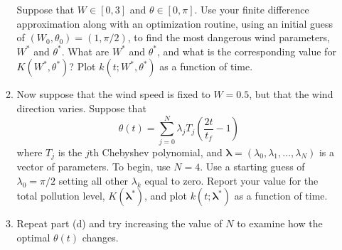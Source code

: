 \documentclass[11pt]{article}
\begin{document}
\begin{enumerate}
\begin{enumerate}
	Suppose that $W \in [0,3]$ and $\theta \in [0,\pi]$. Use your finite
	difference approximation along with an optimization routine, using an
	initial guess of $(W_0,\theta_0) = (1,\pi/2)$, to find the most
	dangerous wind parameters, $W^\ast$ and $\theta^\ast$. What are
	$W^\ast$ and $\theta^\ast$, and what is the corresponding value for
	$K(W^\ast,\theta^\ast)$? Plot $k(t;W^\ast,\theta^\ast)$ as a function
	of time.
      \item Now suppose that the wind speed is fixed to $W=0.5$, but that
	the wind direction varies. Suppose that
	\begin{equation}
	  \theta(t) = \sum_{j=0}^N \lambda_j T_j\left( \frac{2t}{t_f}-1\right)
        \end{equation}
	where $T_j$ is the $j$th Chebyshev polynomial, and
	$\boldsymbol\lambda=(\lambda_0,\lambda_1,\ldots,\lambda_N)$ is a vector
	of parameters. To begin, use $N=4$. Use a starting guess of
	$\lambda_0=\pi/2$ setting all other $\lambda_k$ equal to zero. Report
	your value for the total pollution level, $K(\boldsymbol\lambda^\ast)$,
	and plot $k(t;\boldsymbol\lambda^\ast)$ as a function of time.
      \item Repeat part (d) and try increasing the value of $N$ to examine how
	the optimal $\theta(t)$ changes.
    \end{enumerate}
\end{enumerate}
\end{document}
